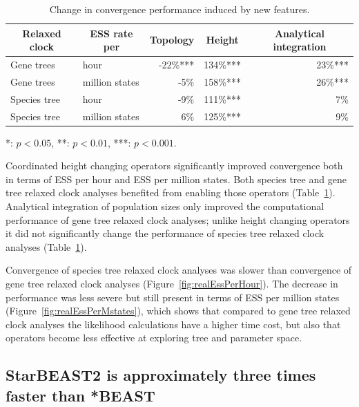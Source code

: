 \documentclass[12pt]{article}
\begin{document}
\begin{table}[htb!]
\centering
\caption{Change in convergence performance induced by new features.}
\label{tab:convergenceLM}
\begin{threeparttable}
\begin{adjustbox}{center}
\begin{tabular}{|l|l|r|r|r|}
\hline
\multicolumn{1}{|c|}{Relaxed clock} & \multicolumn{1}{c|}{ESS rate per} & \multicolumn{1}{c|}{Topology} & \multicolumn{1}{c|}{Height} & \multicolumn{1}{c|}{Analytical integration}\tabularnewline
\hline
Gene trees & hour & -22\%{***} & 134\%{***} & 23\%{***}\tabularnewline
\hline
Gene trees & million states & -5\%\hphantom{***} & 158\%{***} & 26\%{***}\tabularnewline
\hline
Species tree & hour & -9\%\hphantom{***} & 111\%{***} & 7\%\hphantom{***}\tabularnewline
\hline
Species tree & million states & 6\%\hphantom{***} & 125\%{***} & 9\%\hphantom{***}\tabularnewline
\hline
\end{tabular}
\end{adjustbox}
\begin{tablenotes}
\small
\item \hspace{1cm} {*}: $p < 0.05$, {**}: $p < 0.01$, {***}: $p < 0.001$.
\end{tablenotes}
\end{threeparttable}
\end{table}

Coordinated height changing operators significantly improved convergence both in
terms of ESS per hour and ESS per million states. Both species tree and gene
tree relaxed clock analyses benefited from enabling those operators (Table~\ref{tab:convergenceLM}). Analytical
integration of population sizes only improved the computational performance of
gene tree relaxed clock analyses; unlike height changing operators it did not
significantly change the performance of species tree relaxed clock analyses
(Table~\ref{tab:convergenceLM}).

Convergence of species tree relaxed clock analyses was slower than convergence
of gene tree relaxed clock analyses (Figure~\ref{fig:realEssPerHour}). The
decrease in performance was less severe but still present in terms of ESS per
million states (Figure~\ref{fig:realEssPerMstates}), which shows that compared
to gene tree relaxed clock analyses the likelihood calculations have a higher
time cost, but also that operators become less effective at exploring tree and
parameter space.

\subsection*{StarBEAST2 is approximately three times faster than *BEAST}
\end{document}
